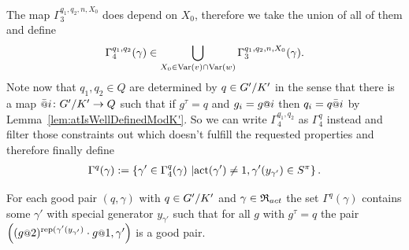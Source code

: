 \documentclass[a4paper,11pt]{amsart}
\begin{document}
 The map $\Gamma_3^{q_1,q_2,n,X_0}$ does depend on $X_0$, therefore we take the union of all of them and define
  \[\Gamma_4^{q_1,q_2}(\gamma)\in \bigcup_{X_0\in \textup{Var}(v)\cap\textup{Var}(w)}\Gamma_3^{q_1,q_2,n,X_0}(\gamma).\]
 Note now that $q_{1},q_2\in Q$ are determined by $q\in{G'/K'}$ in the sense that there is a map $\att{i}\colon \RNK{G'}{K'}\to Q$ such that if $g^\tau = q$ and $g_i=g\at{i}$ 
 then $q_i = q\att{i}$  by Lemma~\ref{lem:atIsWellDefinedModK'}. So we can write $\Gamma_4^{q_1,q_2}$ as $\Gamma_4^q$ instead and filter those 
 constraints out which doesn't fulfill the requested properties and therefore finally define
 \begin{align}
 \Gamma^q(\gamma) := \left\{\gamma' \in \Gamma_4^q(\gamma) \ \middle \vert 
  \operatorname{act}(\gamma')\neq 1, \gamma'({y_{\gamma'}}) \in S^\pi \right\}. 
  \label{def:Gammaq}
 \end{align}
 \begin{pro}\label{pro:existsNextPair}
 For each good pair $(q,\gamma)$ with $q\in{G'/K'}$ and $\gamma\in\mathfrak{R}_{act}$ the set $\Gamma^q(\gamma)$ 
 contains some $\gamma'$ with special generator $y_{\gamma'}$ such that for all $g$ with $g^\tau=q$ the
 pair $\left((g\at{2})^{\textup{rep}(\gamma'(y_{\gamma'})}\cdot g\at{1},\gamma'\right)$ is a good pair.
\end{pro}
\end{document}
